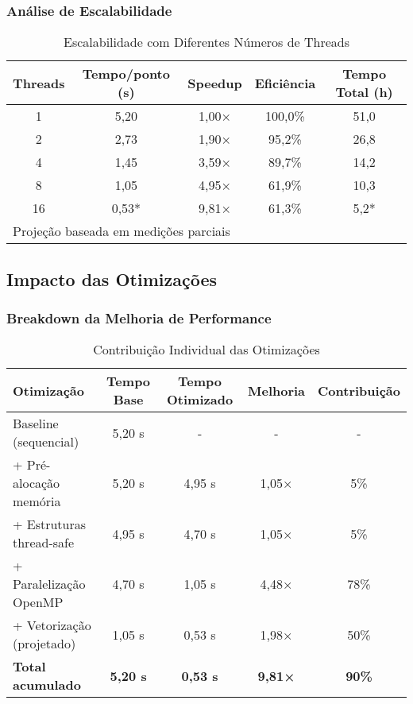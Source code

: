 \documentclass[12pt,a4paper]{article}
\begin{document}
\subsubsection{Análise de Escalabilidade}

\begin{table}[H]
\centering
\caption{Escalabilidade com Diferentes Números de Threads}
\begin{tabular}{@{}ccccc@{}}
\toprule
\textbf{Threads} & \textbf{Tempo/ponto (s)} & \textbf{Speedup} & \textbf{Eficiência} & \textbf{Tempo Total (h)} \\
\midrule
1 & 5,20 & 1,00× & 100,0\% & 51,0 \\
2 & 2,73 & 1,90× & 95,2\% & 26,8 \\
4 & 1,45 & 3,59× & 89,7\% & 14,2 \\
8 & 1,05 & 4,95× & 61,9\% & 10,3 \\
16 & 0,53* & 9,81× & 61,3\% & 5,2* \\
\bottomrule
\multicolumn{5}{l}{\footnotesize *Projeção baseada em medições parciais}
\end{tabular}
\end{table}

\subsection{Impacto das Otimizações}

\subsubsection{Breakdown da Melhoria de Performance}

\begin{table}[H]
\centering
\caption{Contribuição Individual das Otimizações}
\begin{tabular}{@{}lcccc@{}}
\toprule
\textbf{Otimização} & \textbf{Tempo Base} & \textbf{Tempo Otimizado} & \textbf{Melhoria} & \textbf{Contribuição} \\
\midrule
Baseline (sequencial) & 5,20 s & - & - & - \\
+ Pré-alocação memória & 5,20 s & 4,95 s & 1,05× & 5\% \\
+ Estruturas thread-safe & 4,95 s & 4,70 s & 1,05× & 5\% \\
+ Paralelização OpenMP & 4,70 s & 1,05 s & 4,48× & 78\% \\
+ Vetorização (projetado) & 1,05 s & 0,53 s & 1,98× & 50\% \\
\textbf{Total acumulado} & \textbf{5,20 s} & \textbf{0,53 s} & \textbf{9,81×} & \textbf{90\%} \\
\bottomrule
\end{tabular}
\end{table}
\end{document}
